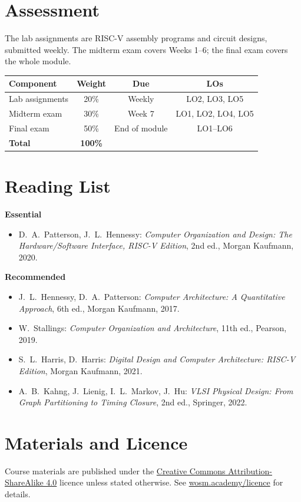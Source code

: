 \documentclass[11pt,a4paper]{article}
\begin{document}
\section{Assessment}
The lab assignments are RISC-V assembly programs and circuit designs, submitted
weekly. The midterm exam covers Weeks 1--6; the final exam covers the whole module.

\begin{tabularx}{\textwidth}{X c c c}
\toprule
\textbf{Component} & \textbf{Weight} & \textbf{Due} & \textbf{LOs} \\
\midrule
Lab assignments     & 20\% & Weekly  & LO2, LO3, LO5 \\
Midterm exam        & 30\% & Week 7  & LO1, LO2, LO4, LO5 \\
Final exam          & 50\% & End of module & LO1--LO6 \\
\midrule
\textbf{Total}      & \textbf{100\%} & & \\
\bottomrule
\end{tabularx}

\section{Reading List}
\textbf{Essential}
\begin{itemize}
  \item D.\ A.\ Patterson, J.\ L.\ Hennessy: \textit{Computer Organization and
        Design: The Hardware/Software Interface, RISC-V Edition}, 2nd ed.,
        Morgan Kaufmann, 2020.
\end{itemize}
\textbf{Recommended}
\begin{itemize}
  \item J.\ L.\ Hennessy, D.\ A.\ Patterson: \textit{Computer Architecture:
        A Quantitative Approach}, 6th ed., Morgan Kaufmann, 2017.
  \item W.\ Stallings: \textit{Computer Organization and Architecture}, 11th ed.,
        Pearson, 2019.
  \item S.\ L.\ Harris, D.\ Harris: \textit{Digital Design and Computer
        Architecture: RISC-V Edition}, Morgan Kaufmann, 2021.
  \item A.\ B.\ Kahng, J.\ Lienig, I.\ L.\ Markov, J.\ Hu: \textit{VLSI Physical
        Design: From Graph Partitioning to Timing Closure}, 2nd ed., Springer, 2022.
\end{itemize}

\section{Materials and Licence}
Course materials are published under the
\href{https://creativecommons.org/licenses/by-sa/4.0/}{Creative Commons Attribution-ShareAlike 4.0}
licence unless stated otherwise. See \href{https://wosm.academy/licence/}{wosm.academy/licence} for details.
\end{document}
